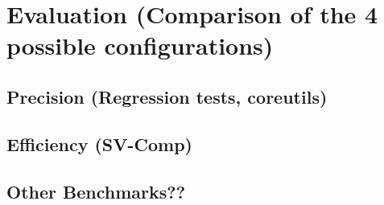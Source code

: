 \chapter{Evaluation (Comparison of the 4 possible configurations)}

\section{Precision (Regression tests, coreutils)}

\section{Efficiency (SV-Comp)}

\section{Other Benchmarks??}
